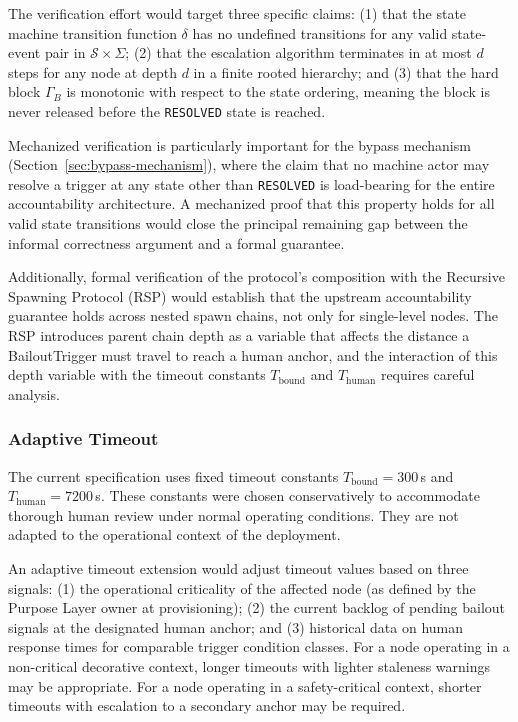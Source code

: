 The verification effort would target three specific claims: (1) that the state machine transition function $\delta$ has no undefined transitions for any valid state-event pair in $\mathcal{S} \times \Sigma$; (2) that the escalation algorithm terminates in at most $d$ steps for any node at depth $d$ in a finite rooted hierarchy; and (3) that the hard block $\Gamma_B$ is monotonic with respect to the state ordering, meaning the block is never released before the \texttt{RESOLVED} state is reached.

Mechanized verification is particularly important for the bypass mechanism (Section~\ref{sec:bypass-mechanism}), where the claim that no machine actor may resolve a trigger at any state other than \texttt{RESOLVED} is load-bearing for the entire accountability architecture. A mechanized proof that this property holds for all valid state transitions would close the principal remaining gap between the informal correctness argument and a formal guarantee.

Additionally, formal verification of the protocol's composition with the Recursive Spawning Protocol (RSP) \cite{bx3-framework} would establish that the upstream accountability guarantee holds across nested spawn chains, not only for single-level nodes. The RSP introduces parent chain depth as a variable that affects the distance a BailoutTrigger must travel to reach a human anchor, and the interaction of this depth variable with the timeout constants $T_{\text{bound}}$ and $T_{\text{human}}$ requires careful analysis.

\subsubsection{Adaptive Timeout}\label{sec:adaptive-timeout}

The current specification uses fixed timeout constants $T_{\text{bound}} = 300$\,s and $T_{\text{human}} = 7200$\,s. These constants were chosen conservatively to accommodate thorough human review under normal operating conditions. They are not adapted to the operational context of the deployment.

An adaptive timeout extension would adjust timeout values based on three signals: (1) the operational criticality of the affected node (as defined by the Purpose Layer owner at provisioning); (2) the current backlog of pending bailout signals at the designated human anchor; and (3) historical data on human response times for comparable trigger condition classes. For a node operating in a non-critical decorative context, longer timeouts with lighter staleness warnings may be appropriate. For a node operating in a safety-critical context, shorter timeouts with escalation to a secondary anchor may be required.

